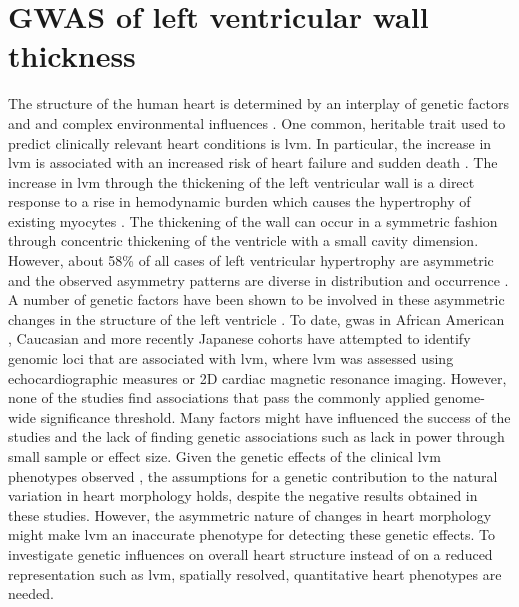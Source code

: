 \chapter{GWAS of left ventricular wall thickness}
\label{chapter:GWAS-3Dheart}
The structure of the human heart is determined by an interplay of genetic factors and and complex environmental influences \citep{Payne1995, Sanoudou2005, OToole2008}. One common, heritable trait used to predict clinically relevant heart conditions is \gls{lvm}. In particular, the increase in \gls{lvm} is associated with an increased risk of heart failure and sudden death \citep{Haider1998,Post1997,Lorell2000}.  The increase in \gls{lvm} through the thickening of the left ventricular wall is a direct response to a rise in hemodynamic burden which causes the hypertrophy of existing myocytes \citep{Lorell2000}. The thickening of the wall can occur in a symmetric fashion through concentric thickening of the ventricle with a small cavity dimension. However, about \num{58}\%  of all cases of left ventricular hypertrophy are asymmetric \citep{Davies1995} and the observed asymmetry patterns are diverse in distribution and occurrence \citep{Hughes2004,Florian2012}. A number of genetic factors have been shown to be involved in these asymmetric changes in the structure of the left ventricle \citep{Davies1995,Chen1999,VanderMerwe2008}. To date, \gls{gwas} in African American \citep{Fox2013}, Caucasian \citep{Vasan2007, Vasan2009, Arnett2009} and more recently Japanese cohorts \citep{Sano2016} have attempted to identify genomic loci that are associated with \gls{lvm}, where \gls{lvm} was assessed using echocardiographic measures or 2D cardiac magnetic resonance imaging. However, none of the studies find associations that pass the commonly applied genome-wide significance threshold. Many factors might have influenced the success of the studies and the lack of finding genetic associations such as lack in power through small sample or effect size. Given the genetic effects of the clinical \gls{lvm} phenotypes observed \citep{Davies1995,Chen1999,VanderMerwe2008}, the assumptions for a genetic contribution to the natural variation in heart morphology holds, despite the negative results obtained in these studies. However, the asymmetric nature of changes in heart morphology might make \gls{lvm} an inaccurate phenotype for detecting these genetic effects. To investigate genetic influences on overall heart structure instead of on a reduced representation such as \gls{lvm}, spatially resolved, quantitative heart phenotypes are needed. 

